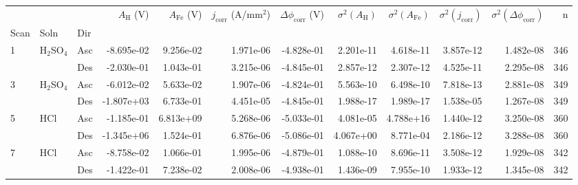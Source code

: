 \begin{tabular}{lllrrrrrrrrr}
\toprule
  &     &     &  $A_{\text{H}}$ (V) &  $A_{\text{Fe}}$ (V) &  $j_{\text{corr}}$ (A/mm$^2$) &  $\Delta \phi_{\text{corr}}$ (V) &  $\sigma^2(A_{\text{H}})$ &  $\sigma^2(A_{\text{Fe}})$ &  $\sigma^2(j_{\text{corr}})$ &  $\sigma^2(\Delta \phi_{\text{corr}})$ &    n \\
Scan & Soln & Dir &                     &                      &                               &                                  &                           &                            &                              &                                        &      \\
\midrule
1 & H$_2$SO$_4$ & Asc &          -8.695e-02 &            9.256e-02 &                     1.971e-06 &                       -4.828e-01 &                 2.201e-11 &                  4.618e-11 &                    3.857e-12 &                              1.482e-08 &  346 \\
  &     & Des &          -2.030e-01 &            1.043e-01 &                     3.215e-06 &                       -4.845e-01 &                 2.857e-12 &                  2.307e-12 &                    4.525e-11 &                              2.295e-08 &  346 \\
3 & H$_2$SO$_4$ & Asc &          -6.012e-02 &            5.633e-02 &                     1.907e-06 &                       -4.824e-01 &                 5.563e-10 &                  6.498e-10 &                    7.818e-13 &                              2.881e-08 &  349 \\
  &     & Des &          -1.807e+03 &            6.733e-01 &                     4.451e-05 &                       -4.845e-01 &                 1.988e-17 &                  1.989e-17 &                    1.538e-05 &                              1.267e-08 &  349 \\
5 & HCl & Asc &          -1.185e-01 &            6.813e+09 &                     5.268e-06 &                       -5.033e-01 &                 4.081e-05 &                  4.788e+16 &                    1.440e-12 &                              3.250e-08 &  360 \\
  &     & Des &          -1.345e+06 &            1.524e-01 &                     6.876e-06 &                       -5.086e-01 &                 4.067e+00 &                  8.771e-04 &                    2.186e-12 &                              3.288e-08 &  360 \\
7 & HCl & Asc &          -8.758e-02 &            1.066e-01 &                     1.995e-06 &                       -4.879e-01 &                 1.088e-10 &                  8.696e-11 &                    3.508e-12 &                              1.929e-08 &  342 \\
  &     & Des &          -1.422e-01 &            7.238e-02 &                     2.008e-06 &                       -4.938e-01 &                 1.436e-09 &                  7.955e-10 &                    1.933e-12 &                              1.345e-08 &  342 \\
\bottomrule
\end{tabular}
